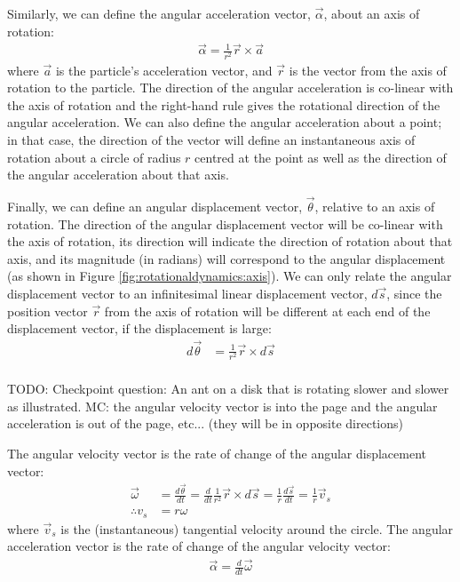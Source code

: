 Similarly, we can define the angular acceleration vector, $\vec \alpha$, about an axis of rotation:
\begin{align}
\vec \alpha = \frac{1}{r^2}\vec r \times \vec a
\end{align}
where $\vec a$ is the particle's acceleration vector,  and $\vec r$ is the vector from the axis of rotation to the particle. The direction of the angular acceleration is co-linear with the axis of rotation and the right-hand rule gives the rotational direction of the angular acceleration. We can also define the angular acceleration about a point; in that case, the direction of the vector will define an instantaneous axis of rotation about a circle of radius $r$ centred at the point as well as the direction of the angular acceleration about that axis.

Finally, we can define an angular displacement vector, $\vec \theta$, relative to an axis of rotation. The direction of the angular displacement vector will be co-linear with the axis of rotation, its direction will indicate the direction of rotation about that axis, and its magnitude (in radians) will correspond to the angular displacement (as shown in Figure \ref{fig:rotationaldynamics:axis}). We can only relate the angular displacement vector to an infinitesimal linear displacement vector, $d\vec s$, since the position vector $\vec r$ from the axis of rotation will be different at each end of the displacement vector, if the displacement is large:
\begin{align*}
d\vec \theta &= \frac{1}{r^2} \vec r \times d\vec s\\
\end{align*}

TODO: Checkpoint question: An ant on a disk that is rotating slower and slower as illustrated. MC: the angular velocity vector is into the page and the angular acceleration is out of the page, etc... (they will be in opposite directions) 


The angular velocity vector is the rate of change of the angular displacement vector:
\begin{align*}
\vec\omega &= \frac{d\vec \theta}{dt} = \frac{d}{dt} \frac{1}{r^2} \vec r \times d\vec s = \frac{1}{r} \frac{d\vec s}{dt} = \frac{1}{r}\vec v_s\\
\therefore v_s &= r\omega
\end{align*}
where $\vec v_s$ is the (instantaneous) tangential velocity around the circle. The angular acceleration vector is the rate of change of the angular velocity vector:
\begin{align*}
\vec\alpha = \frac{d}{dt} \vec \omega
\end{align*}

